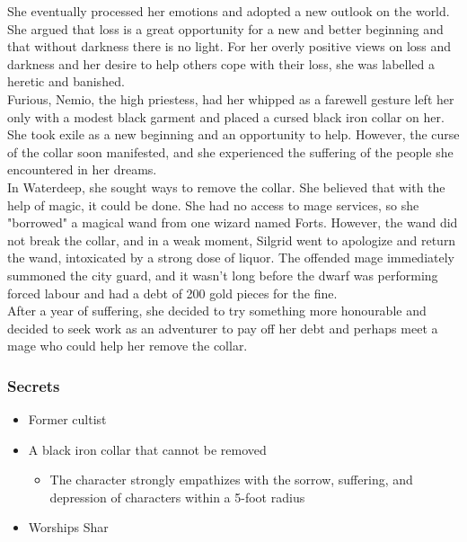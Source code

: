 \documentclass[10pt,twocolumn,twoside,openany,bg=full,layout=true,nomultitoc]{dndbook}
\begin{document}
She eventually processed her emotions and adopted a new outlook on the world.
She argued that loss is a great opportunity for a new and better beginning and that without darkness there is no light.
For her overly positive views on loss and darkness and her desire to help others cope with their loss,
she was labelled a heretic and banished.\\

Furious, Nemio, the high priestess, had her whipped as a farewell gesture left her only with a modest black garment
and placed a cursed black iron collar on her.\\

She took exile as a new beginning and an opportunity to help.
However, the curse of the collar soon manifested, and she experienced the suffering of the people she encountered in her dreams.\\

In Waterdeep, she sought ways to remove the collar.
She believed that with the help of magic, it could be done.
She had no access to mage services, so she "borrowed" a magical wand from one wizard named Forts.
However, the wand did not break the collar, and in a weak moment, Silgrid went to apologize and return the wand,
intoxicated by a strong dose of liquor.
The offended mage immediately summoned the city guard, and it wasn't long before the dwarf was performing forced labour
and had a debt of 200 gold pieces for the fine.\\

After a year of suffering, she decided to try something more honourable and decided to seek work as an adventurer
to pay off her debt and perhaps meet a mage who could help her remove the collar.\\

\subsubsection{Secrets}
\begin{itemize}
  \item Former cultist
  \item A black iron collar that cannot be removed
  \begin{itemize}
    \item The character strongly empathizes with the sorrow, suffering, and depression of characters within a 5-foot radius
  \end{itemize}
\item Worships Shar
\end{itemize}
\end{document}
